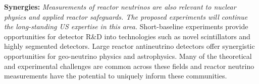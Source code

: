 {\bf Synergies:} {\em Measurements of reactor neutrinos are also
relevant to nuclear physics and applied reactor safeguards. The
proposed experiments will continue the long-standing US expertise in
this area.} Short-baseline experiments provide opportunities for
detector R\&D into technologies such as novel scintillators and highly
segmented detectors. Large reactor antineutrino detectors offer
synergistic opportunities for geo-neutrino physics and
astrophysics. Many of the theoretical and experimental challenges are
common across these fields and reactor neutrino measurements have the
potential to uniquely inform these communities.
